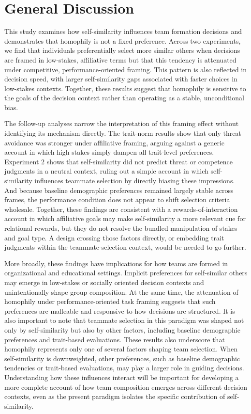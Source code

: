 \documentclass[
  man,
  floatsintext,
  longtable,
  nolmodern,
  notxfonts,
  notimes,
  draftfirst,
  colorlinks=true,linkcolor=blue,citecolor=blue,urlcolor=blue]{apa7}
\begin{document}
\section{General Discussion}\label{general-discussion}

This study examines how self-similarity influences team formation
decisions and demonstrates that homophily is not a fixed preference.
Across two experiments, we find that individuals preferentially select
more similar others when decisions are framed in low-stakes, affiliative
terms but that this tendency is attenuated under competitive,
performance-oriented framing. This pattern is also reflected in decision
speed, with larger self-similarity gaps associated with faster choices
in low-stakes contexts. Together, these results suggest that homophily
is sensitive to the goals of the decision context rather than operating
as a stable, unconditional bias.

The follow-up analyses narrow the interpretation of this framing effect
without identifying its mechanism directly. The trait-norm results show
that only threat avoidance was stronger under affiliative framing,
arguing against a generic account in which high stakes simply dampen all
trait-level preferences. Experiment 2 shows that self-similarity did not
predict threat or competence judgments in a neutral context, ruling out
a simple account in which self-similarity influences teammate selection
by directly biasing these impressions. And because baseline demographic
preferences remained largely stable across frames, the performance
condition does not appear to shift selection criteria wholesale.
Together, these findings are consistent with a rewards-of-interaction
account in which affiliative goals may make self-similarity a more
relevant cue for relational rewards, but they do not resolve the bundled
manipulation of stakes and goal type. A design crossing those factors
directly, or embedding trait judgments within the teammate-selection
context, would be needed to go further.

More broadly, these findings have implications for how teams are formed
in organizational and educational settings. Implicit preferences for
self-similar others may emerge in low-stakes or socially oriented
decision contexts and unintentionally shape group composition. At the
same time, the attenuation of homophily under performance-oriented task
framing suggests that such preferences are malleable and responsive to
how decisions are structured. It is also important to note that teammate
selection in this paradigm was shaped not only by self-similarity but
also by other factors, including baseline demographic preferences and
trait-based evaluations. These results also underscore that homophily
represents only one of several factors shaping team selection. When
self-similarity is downweighted, other preferences, such as baseline
demographic tendencies or trait-based evaluations, may play a larger
role in guiding decisions. Understanding how these influences interact
will be important for developing a more complete account of how team
composition emerges across different decision contexts, even as the
present paradigm isolates the specific contribution of self-similarity.
\end{document}
